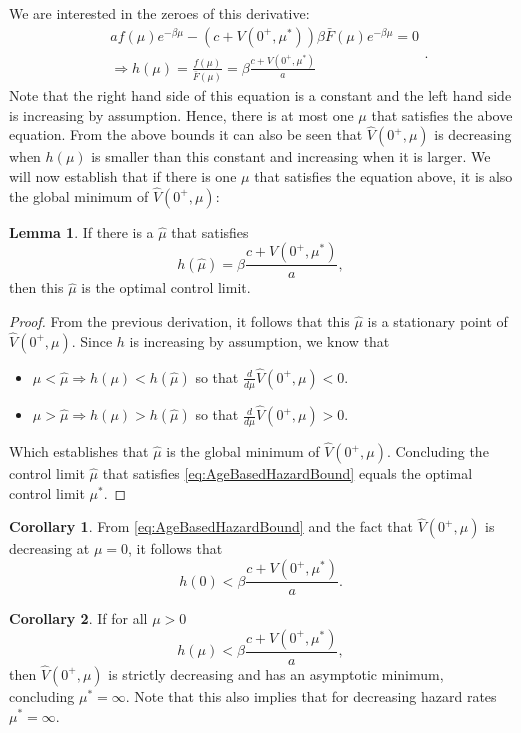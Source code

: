 \documentclass[a4paper]{thesis}
\theoremstyle{definition}
\newtheorem{corollary}{Corollary}[chapter]
\newtheorem{lemma}{Lemma}
\begin{document}
We are interested in the zeroes of this derivative:
\[
\begin{split}
&af(\mu)e^{-\beta\mu}-(c+V(0^+,\mu^*))\beta\bar{F}(\mu)e^{-\beta\mu}=0\\
&\Rightarrow h(\mu)=\frac{f(\mu)}{\bar{F}(\mu)}=\beta\frac{c+V(0^+,\mu^*)}{a}
\end{split}
.\]
Note that the right hand side of this equation is a constant and the left hand side is increasing by assumption.
Hence, there is at most one $\mu$ that satisfies the above equation.
From the above bounds it can also be seen that $\hat{V}(0^+,\mu)$ is decreasing when $h(\mu)$ is smaller than this constant and increasing when it is larger.
We will now establish that if there is one $\mu$ that satisfies the equation above, it is also the global minimum of $\hat{V}(0^+,\mu)$:
\begin{lemma}
	If there is a $\hat{\mu}$ that satisfies
	\begin{equation}\label{eq:AgeBasedHazardBound}
	h(\hat{\mu})=\beta\frac{c+V(0^+,\mu^*)}{a},
	\end{equation}
	then this $\hat{\mu}$ is the optimal control limit.
	\begin{proof}
		From the previous derivation, it follows that this $\hat{\mu}$ is a stationary point of $\hat{V}(0^+,\mu)$.
		Since $h$ is increasing by assumption, we know that
		\begin{itemize}
			\item $\mu<\hat{\mu}\Rightarrow h(\mu)<h(\hat{\mu})$ so that $\frac{d}{d\mu}\hat{V}(0^+,\mu)<0$.
			\item $\mu>\hat{\mu}\Rightarrow h(\mu)>h(\hat{\mu})$ so that $\frac{d}{d\mu}\hat{V}(0^+,\mu)>0$.
		\end{itemize}
		Which establishes that $\hat{\mu}$ is the global minimum of $\hat{V}(0^+,\mu)$.
		Concluding the control limit $\hat{\mu}$ that satisfies \eqref{eq:AgeBasedHazardBound} equals the optimal control limit $\mu^*$.
	\end{proof}
\end{lemma}
\begin{corollary}
	From \eqref{eq:AgeBasedHazardBound} and the fact that $\hat{V}(0^+,\mu)$ is decreasing at $\mu=0$, it follows that
	\[
	h(0)<\beta\frac{c+V(0^+,\mu^*)}{a}.
	\]
\end{corollary}
\begin{corollary}
If for all $\mu>0$
\[
h(\mu)<\beta\frac{c+V(0^+,\mu^*)}{a},
\]
then $\hat{V}(0^+,\mu)$ is strictly decreasing and has an asymptotic minimum, concluding $\mu^*=\infty$.
Note that this also implies that for decreasing hazard rates $\mu^*=\infty$.
\end{corollary}
\end{document}
